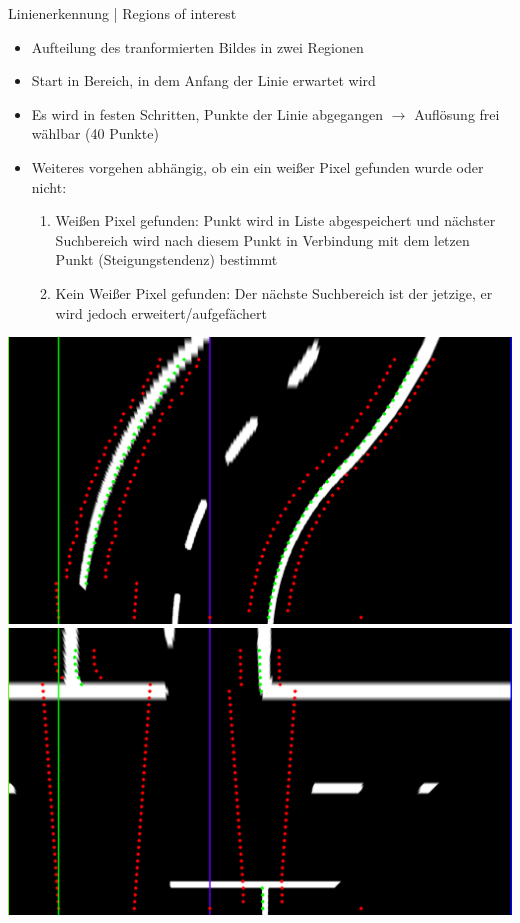 \documentclass[aspectratio=169]{beamer}
\newcommand{\enquote}[1]{\glqq{}#1\grqq{}}
\begin{document}
\begin{frame}{Linienerkennung | \enquote{Regions of interest}}
	\begin{itemize}
		\item Aufteilung des tranformierten Bildes in zwei Regionen
		\item Start in Bereich, in dem Anfang der Linie erwartet wird
		\item Es wird in festen Schritten, Punkte der Linie abgegangen $\rightarrow$ Auflösung frei wählbar (40 Punkte)
		\item Weiteres vorgehen abhängig, ob ein ein weißer Pixel gefunden wurde oder nicht:
		      \begin{enumerate}
			      \item Weißen Pixel gefunden: Punkt wird in Liste abgespeichert und nächster Suchbereich wird nach diesem Punkt in Verbindung mit dem letzen Punkt (Steigungstendenz) bestimmt
			      \item Kein Weißer Pixel gefunden: Der nächste Suchbereich ist der jetzige, er wird jedoch erweitert/aufgefächert
		      \end{enumerate}
	\end{itemize}
	\begin{center}
		\includegraphics[width=.35\textwidth]{img/line_detection_normal.png}
		\includegraphics[width=.35\textwidth]{img/line_detection_crossing.png}
	\end{center}
\end{frame}
\end{document}
